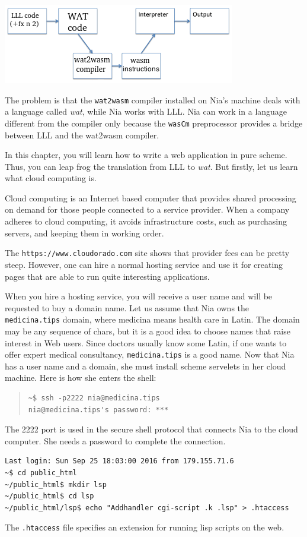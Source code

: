 \documentclass[a4paper,12pt]{book}
\begin{document}
\includegraphics[scale=0.8]{figs/source.png}


The problem is that the \verb|wat2wasm|
compiler installed on
Nia's machine deals with a language
called {\em wat}, while Nia 
works with LLL. Nia can work in a
language different from the compiler
only because the \verb|wasCm| preprocessor
provides a bridge between LLL and the
wat2wasm compiler.


In this chapter, you will learn how
to write a web application in pure
scheme. Thus, you can leap frog
the translation from LLL to {\em wat}.
But firstly,
let us learn what cloud computing is.

Cloud computing is an Internet based
computer that provides shared
processing  on demand for those people
connected to a service provider.
When a  company adheres to cloud computing,
it avoids infrastructure costs,
such as purchasing servers, and keeping
them in working order.

The \verb|https://www.cloudorado.com|
site shows that provider fees
can be pretty steep.
However, one can hire a normal
hosting service and use it for
creating pages that are able to
run quite interesting applications.

When you hire a hosting service,
you will receive a user name and
will be requested to
buy a domain name. Let us
assume that Nia owns the
\verb|medicina.tips| domain,
where {\sc medicina} means
health care in Latin. The domain
may be any sequence of chars,
but it is a good idea to choose
names that raise interest in
Web users. Since doctors usually
know some Latin, if one wants to offer
expert medical consultancy, \verb|medicina.tips|
is a good name.
Now that Nia has a user name and a
domain, she must install scheme servelets
in her cloud machine. Here is how
she enters the shell:
\begin{quote}
\begin{verbatim}
~$ ssh -p2222 nia@medicina.tips
nia@medicina.tips's password: ***
\end{verbatim}
\end{quote}
The 2222 port is used in the secure shell protocol
that connects Nia to the cloud computer.
She needs a password to complete the connection.
\begin{Verbatim}[fontsize=\small,
frame=single,
framerule=0.5mm]
Last login: Sun Sep 25 18:03:00 2016 from 179.155.71.6
~$ cd public_html
~/public_html$ mkdir lsp
~/public_html$ cd lsp
~/public_html/lsp$ echo "Addhandler cgi-script .k .lsp" > .htaccess
\end{Verbatim}
The \verb|.htaccess| file specifies 
an extension for running lisp scripts on the web.
\end{document}

